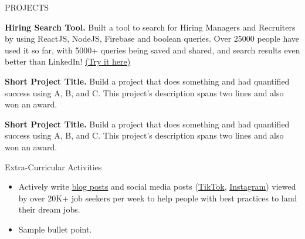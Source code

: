 \documentclass{resume} %
\begin{document}





\begin{rSection}{PROJECTS}

\vspace{-1.25em}

\item \textbf{Hiring Search Tool.} {Built a tool to search for Hiring Managers and Recruiters by using ReactJS, NodeJS, Firebase and boolean queries. Over 25000 people have used it so far, with 5000+ queries being saved and shared, and search results even better than LinkedIn! \href{https://hiring-search.careerflow.ai/}{(Try it here)}}

\item \textbf{Short Project Title.} {Build a project that does something and had quantified success using A, B, and C. This project's description spans two lines and also won an award.}

\item \textbf{Short Project Title.} {Build a project that does something and had quantified success using A, B, and C. This project's description spans two lines and also won an award.}

\end{rSection} 




\begin{rSection}{Extra-Curricular Activities} 

\begin{itemize}

    \item 	Actively write \href{https://www.faangpath.com/blog/}{blog posts} and social media posts (\href{https://www.tiktok.com/@faangpath}{TikTok}, \href{https://www.instagram.com/faangpath/?hl=en}{Instagram}) viewed by over 20K+ job seekers per week to help people with best practices to land their dream jobs. 

    \item	Sample bullet point.

\end{itemize}





\end{rSection}
\end{document}
